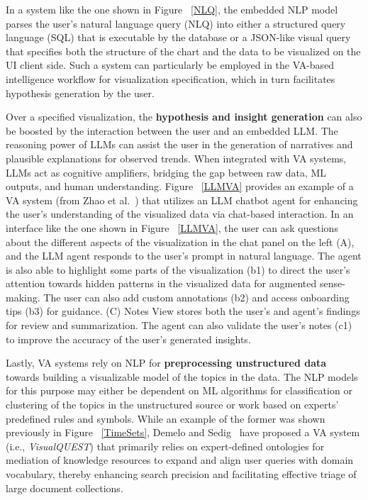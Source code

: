 \documentclass{sfuthesis}
\begin{document}
In a system like the one shown in Figure ~\ref{NLQ}, the embedded NLP model parses the user’s natural language query (NLQ) into either a structured query language (SQL) that is executable by the database or a JSON-like visual query that specifies both the structure of the chart and the data to be visualized on the UI client side. Such a system can particularly be employed in the VA-based intelligence workflow for visualization specification, which in turn facilitates hypothesis generation by the user.\par
Over a specified visualization, the \textbf{hypothesis and insight generation} can also be boosted by the interaction between the user and an embedded LLM. The reasoning power of LLMs can assist the user in the generation of narratives and plausible explanations for observed trends. When integrated with VA systems, LLMs act as cognitive amplifiers, bridging the gap between raw data, ML outputs, and human understanding. Figure ~\ref{LLMVA} provides an example of a VA system (from Zhao et al.~\cite{zhao2025proactiveva}) that utilizes an LLM chatbot agent for enhancing the user’s understanding of the visualized data via chat-based interaction. In an interface like the one shown in Figure ~\ref{LLMVA}, the user can ask questions about the different aspects of the visualization in the chat panel on the left (A), and the LLM agent responds to the user's prompt in natural language. The agent is also able to highlight some parts of the visualization (b1) to direct the user’s attention towards hidden patterns in the visualized data for augmented sense-making. The user can also add custom annotations (b2) and access onboarding tips (b3) for guidance. (C) Notes View stores both the user's and agent's findings for review and summarization. The agent can also validate the user's notes (c1) to improve the accuracy of the user's generated insights.\par

Lastly, VA systems rely on NLP for \textbf{preprocessing unstructured data} towards building a visualizable model of the topics in the data. The NLP models for this purpose may either be dependent on ML algorithms for classification or clustering of the topics in the unstructured source or work based on experts’ predefined rules and symbols. While an example of the former was shown previously in Figure ~\ref{TimeSets}, Demelo and Sedig~\cite{demelo2021interfaces} have proposed a VA system (i.e., \textit{VisualQUEST}) that primarily relies on expert-defined ontologies for mediation of knowledge resources to expand and align user queries with domain vocabulary, thereby enhancing search precision and facilitating effective triage of large document collections.
\end{document}
